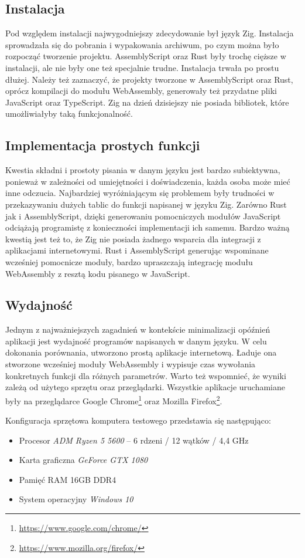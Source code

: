 \documentclass[language=polish,type=master]{aghmodern}
\begin{document}
\subsection{Instalacja}
Pod względem instalacji najwygodniejszy zdecydowanie był język Zig.
Instalacja sprowadzała się do pobrania i wypakowania archiwum, po czym można było rozpocząć tworzenie projektu.
AssemblyScript oraz Rust były trochę cięższe w instalacji, ale nie były one też specjalnie trudne.
Instalacja trwała po prostu dłużej.
Należy też zaznaczyć, że projekty tworzone w AssemblyScript oraz Rust, oprócz kompilacji do modułu WebAssembly, generowały też przydatne pliki JavaScript oraz TypeScript.
Zig na dzień dzisiejszy nie posiada bibliotek, które umożliwiałyby taką funkcjonalność.

\subsection{Implementacja prostych funkcji}
Kwestia składni i prostoty pisania w danym języku jest bardzo subiektywna, ponieważ w zależności od umiejętności i doświadczenia, każda osoba może mieć inne odczucia.
Najbardziej wyróżniającym się problemem były trudności w przekazywaniu dużych tablic do funkcji napisanej w języku Zig.
Zarówno Rust jak i AssemblyScript, dzięki generowaniu pomocniczych modułów JavaScript odciążają programistę z konieczności implementacji ich samemu.
Bardzo ważną kwestią jest też to, że Zig nie posiada żadnego wsparcia dla integracji z aplikacjami internetowymi.
Rust i AssemblyScript generując wspominane wcześniej pomocnicze moduły, bardzo upraszczają integrację modułu WebAssembly z resztą kodu pisanego w JavaScript.

\subsection{Wydajność}
Jednym z najważniejszych zagadnień w kontekście minimalizacji opóźnień aplikacji jest wydajność programów napisanych w danym języku.
W celu dokonania porównania, utworzono prostą aplikacje internetową.
Ładuje ona stworzone wcześniej moduły WebAssembly i wypisuje czas wywołania konkretnych funkcji dla różnych parametrów.
Warto też wspomnieć, że wyniki zależą od użytego sprzętu oraz przeglądarki.
Wszystkie aplikacje uruchamiane były na przeglądarce Google Chrome\footnote{\url{https://www.google.com/chrome/}} oraz Mozilla Firefox\footnote{\url{https://www.mozilla.org/firefox/}}.

Konfiguracja sprzętowa komputera testowego przedstawia się następująco:
\begin{itemize}
    \item Procesor \emph{ADM Ryzen 5 5600} -- 6 rdzeni / 12 wątków / 4,4 GHz
    \item Karta graficzna \emph{GeForce GTX 1080}
    \item Pamięć RAM 16GB DDR4
    \item System operacyjny \emph{Windows 10}
\end{itemize}
\end{document}
